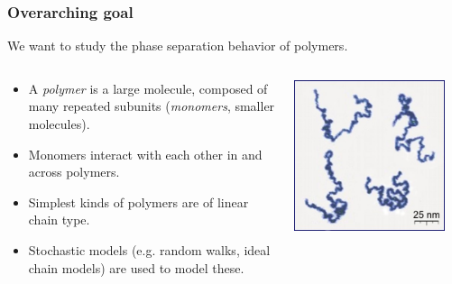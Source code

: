 \begin{frame}
        \titlepage
\end{frame}

\begin{frame}[t]
    \frametitle{Overarching goal}

    We want to study the phase separation behavior of polymers.

    \vfill

    \begin{columns}
        \begin{column}{0.6\textwidth}
            \begin{itemize}
                \item {} A \emph{polymer} is a large molecule, composed of many repeated subunits (\emph{monomers}, smaller molecules).
                \item {} Monomers interact with each other in and across polymers.
                \item {} Simplest kinds of polymers are of linear chain type.
                \item Stochastic models (e.g. random walks, ideal chain models) are used to model these.
            \end{itemize}
        \end{column}
        \begin{column}{0.4\textwidth}
            \centering
            \includegraphics[width=0.9\textwidth]{figures/Single_Polymer_Chains_AFM.jpg}
        \end{column}
    \end{columns}
\end{frame}

